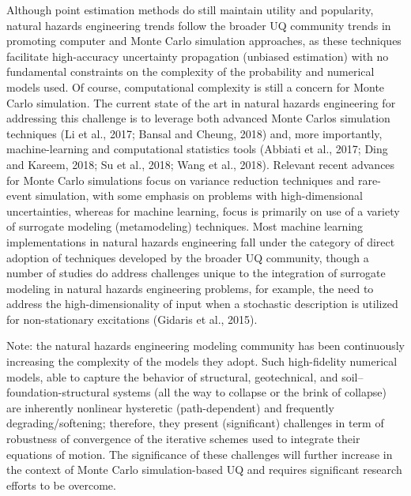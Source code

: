 Although point estimation methods do still maintain utility and popularity, natural hazards engineering trends follow the broader UQ community trends in promoting computer and Monte Carlo simulation approaches, as these techniques facilitate high-accuracy uncertainty propagation (unbiased estimation) with no fundamental constraints on the complexity of the probability and numerical models used. Of course, computational complexity is still a concern for Monte Carlo simulation. The current state of the art in natural hazards engineering for addressing this challenge is to leverage both advanced Monte Carlos simulation techniques (Li et al., 2017; Bansal and Cheung, 2018) and, more importantly, machine-learning and computational statistics tools (Abbiati et al., 2017; Ding and Kareem, 2018; Su et al., 2018; Wang et al., 2018). Relevant recent advances for Monte Carlo simulations focus on variance reduction techniques and rare-event simulation, with some emphasis on problems with high-dimensional uncertainties, whereas for machine learning, focus is primarily on use of a variety of surrogate modeling (metamodeling) techniques. Most machine learning implementations in natural hazards engineering fall under the category of direct adoption of techniques developed by the broader UQ community, though a number of studies do address challenges unique to the integration of surrogate modeling in natural hazards engineering problems, for example, the need to address the high-dimensionality of input when a stochastic description is utilized for non-stationary excitations (Gidaris et al., 2015).

Note: the natural hazards engineering modeling community has been continuously increasing the complexity of the models they adopt. Such high-fidelity numerical models, able to capture the behavior of structural, geotechnical, and soil–foundation-structural systems (all the way to collapse or the brink of collapse) are inherently nonlinear hysteretic (path-dependent) and frequently degrading/softening; therefore, they present (significant) challenges in term of robustness of convergence of the iterative schemes used to integrate their equations of motion. The significance of these challenges will further increase in the context of Monte Carlo simulation-based UQ and requires significant research efforts to be overcome.

